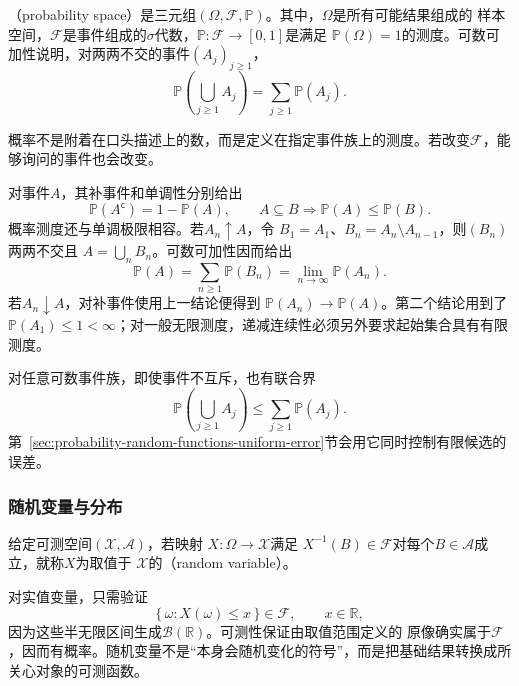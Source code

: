 \begin{definition}[概率空间]
  \label{def:probability-space}
（probability space）是三元组\((\Omega,\mathcal{F},\mathbb{P})\)。其中，\(\Omega\)是所有可能结果组成的
样本空间，\(\mathcal{F}\)是事件组成的\(\sigma\)代数，\(\mathbb{P}:\mathcal{F}\to[0,1]\)是满足
\(\mathbb{P}(\Omega)=1\)的测度。可数可加性说明，对两两不交的事件\((A_j)_{j\geq1}\)，
\[ \mathbb{P}\left(\bigcup_{j\geq1}A_j\right)
  =\sum_{j\geq1}\mathbb{P}(A_j). \]
\end{definition}
概率不是附着在口头描述上的数，而是定义在指定事件族上的测度。若改变\(\mathcal{F}\)，能够询问的事件也会改变。

对事件\(A\)，其补事件和单调性分别给出
\[ \mathbb{P}(A^{\mathsf c})=1-\mathbb{P}(A),
  \qquad A\subseteq B\Longrightarrow\mathbb{P}(A)\leq\mathbb{P}(B). \]
概率测度还与单调极限相容。若\(A_n\uparrow A\)，令
\(B_1=A_1\)、\(B_n=A_n\setminus A_{n-1}\)，则\((B_n)\)两两不交且
\(A=\bigcup_nB_n\)。可数可加性因而给出
\[
  \mathbb{P}(A)
  =\sum_{n\geq1}\mathbb{P}(B_n)
  =\lim_{n\to\infty}\mathbb{P}(A_n).
\]
若\(A_n\downarrow A\)，对补事件使用上一结论便得到
\(\mathbb{P}(A_n)\to\mathbb{P}(A)\)。第二个结论用到了
\(\mathbb{P}(A_1)\leq1<\infty\)；对一般无限测度，递减连续性必须另外要求起始集合具有有限测度。

对任意可数事件族，即使事件不互斥，也有联合界
\begin{equation}
  \mathbb{P}\left(\bigcup_{j\geq1}A_j\right)
  \leq
  \sum_{j\geq1}\mathbb{P}(A_j).
  \label{eq:probability-union-bound}
\end{equation}
第~\ref{sec:probability-random-functions-uniform-error}节会用它同时控制有限候选的误差。

\subsubsection{随机变量与分布}

\begin{definition}[随机变量]
  \label{def:probability-random-variable}
给定可测空间\((\mathcal{X},\mathcal{A})\)，若映射
\(X:\Omega\to\mathcal{X}\)满足
\(X^{-1}(B)\in\mathcal{F}\)对每个\(B\in\mathcal{A}\)成立，就称\(X\)为取值于
\(\mathcal{X}\)的（random variable）。
\end{definition}
对实值变量，只需验证
\[ \{\,\omega:X(\omega)\leq x\,\}\in\mathcal{F},
  \qquad x\in\mathbb{R}, \]
因为这些半无限区间生成\(\mathcal{B}(\mathbb{R})\)。可测性保证由取值范围定义的
原像确实属于\(\mathcal{F}\)，因而有概率。随机变量不是“本身会随机变化的符号”，而是把基础结果转换成所关心对象的可测函数。

